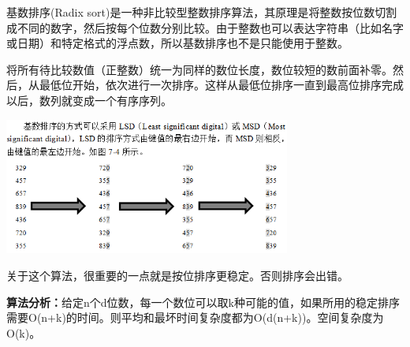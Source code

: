 基数排序(Radix
sort)是一种非比较型整数排序算法，其原理是{将整数按位数切割成不同的数字，然后按每个位数分别比较}。由于整数也可以表达字符串（比如名字或日期）和特定格式的浮点数，所以基数排序也不是只能使用于整数。

将所有待比较数值（正整数）统一为同样的数位长度，数位较短的数前面补零。然后，从最低位开始，依次进行一次排序。这样从最低位排序一直到最高位排序完成以后，数列就变成一个有序序列。

\includegraphics[width=3.70833in,height=1.77083in]{png-jpeg-pics/A5BBC1816F49FFEDC5AFA6AC3CA4666D.png}

{关于这个算法，很重要的一点就是按位排序更稳定。否则排序会出错。}

{\textbf{算法分析：}}{给定n个d位数，每一个数位可以取k种可能的值，如果所用的稳定排序需要O(n+k)的时间。则平均和最坏时间复杂度都为O(d(n+k))。空间复杂度为O(k)。}{}
